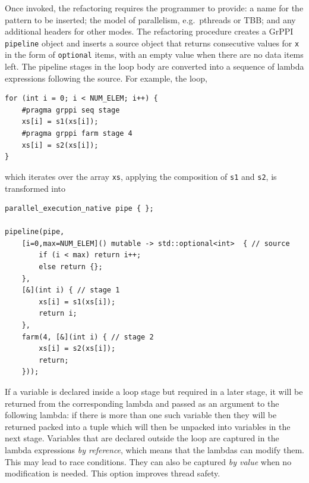 Once invoked, the refactoring requires the programmer to provide: a name for the pattern to be inserted; the model of parallelism, e.g.\ pthreads or TBB; and any additional headers for other modes. 
% 
The refactoring procedure creates a GrPPI \lstinline|pipeline| object and
inserts a source object that returns consecutive values for \texttt{x}
in the form of \texttt{optional} items, with an empty value when there
are no data items left.
% 
The pipeline stages in the loop body are converted into a sequence of
lambda expressions following the source.
% 
For example, the loop,
% 
\begin{lstlisting}
for (int i = 0; i < NUM_ELEM; i++) {
    #pragma grppi seq stage
    xs[i] = s1(xs[i]);
    #pragma grppi farm stage 4
    xs[i] = s2(xs[i]);
}
\end{lstlisting}
% 
\noindent
which iterates over the array \texttt{xs}, applying the composition of \texttt{s1} and \texttt{s2}, is transformed into
% 
\begin{lstlisting}
parallel_execution_native pipe { };

pipeline(pipe,
    [i=0,max=NUM_ELEM]() mutable -> std::optional<int>  { // source
    	if (i < max) return i++;
    	else return {};
    },
    [&](int i) { // stage 1
    	xs[i] = s1(xs[i]);
    	return i;
    },
    farm(4, [&](int i) { // stage 2
    	xs[i] = s2(xs[i]);
    	return;
    }));
\end{lstlisting}
%
If a variable is declared
inside a loop stage but required in a later stage, it will be returned
from the corresponding lambda and passed as an argument to the following
lambda: if there is more than one such variable then they will be
returned packed into a tuple which will then be unpacked into variables
in the next stage.
%
Variables that are declared outside the loop are captured in the lambda
expressions \emph{by reference}, which means that the lambdas can modify
them. This may lead to race conditions. They can also be captured \emph{by value} when no modification is needed. This option improves thread safety.

